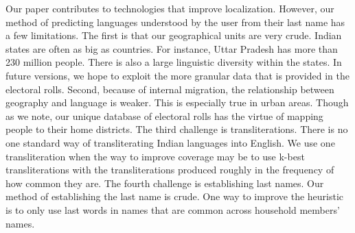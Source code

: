 \documentclass[11pt,  letterpaper]{article}
\begin{document}
Our paper contributes to technologies that improve localization. However, our method of predicting languages understood by the user from their last name has a few limitations. The first is that our geographical units are very crude. Indian states are often as big as countries. For instance, Uttar Pradesh has more than 230 million people. There is also a large linguistic diversity within the states. In future versions, we hope to exploit the more granular data that is provided in the electoral rolls. Second, because of internal migration, the relationship between geography and language is weaker. This is especially true in urban areas. Though as we note, our unique database of electoral rolls has the virtue of mapping people to their home districts. The third challenge is transliterations. There is no one standard way of transliterating Indian languages into English. We use one transliteration when the way to improve coverage may be to use k-best transliterations with the transliterations produced roughly in the frequency of how common they are. The fourth challenge is establishing last names. Our method of establishing the last name is crude. One way to improve the heuristic is to only use last words in names that are common across household members’ names. 

\newpage


\end{document}
